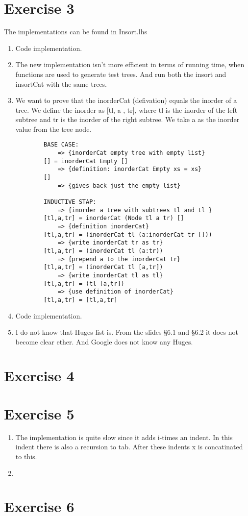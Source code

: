 \documentclass{article}
\begin{document}
\section*{Exercise 3}
The implementations can be found in Insort.lhs\\
\begin{enumerate}
    \item Code implementation.
    \item The new implementation isn't more efficient in terms of running time, when functions are used to generate test trees. And run both the insort and insortCat with the same trees.
    \item We want to prove that the inorderCat (defivation) equals the inorder of a tree. We define the inorder as [tl, a , tr], where tl is the inorder of the left subtree and tr is the inorder of the right subtree. We take a as the inorder value from the tree node.
        \begin{verbatim}
        BASE CASE:
            => {inorderCat empty tree with empty list}
        [] = inorderCat Empty []
            => {definition: inorderCat Empty xs = xs}
        []
            => {gives back just the empty list}
        
        INDUCTIVE STAP:
            => {inorder a tree with subtrees tl and tl }
        [tl,a,tr] = inorderCat (Node tl a tr) []
            => {definition inorderCat}
        [tl,a,tr] = (inorderCat tl (a:inorderCat tr []))
            => {write inorderCat tr as tr}
        [tl,a,tr] = (inorderCat tl (a:tr))
            => {prepend a to the inorderCat tr}
        [tl,a,tr] = (inorderCat tl [a,tr])
            => {write inorderCat tl as tl}
        [tl,a,tr] = (tl [a,tr])
            => {use definition of inorderCat}
        [tl,a,tr] = [tl,a,tr]
        \end{verbatim}
    
    \item Code implementation. 
    \item I do not know that Huges list is. From the slides §6.1 and §6.2 it does not become clear ether. And Google does not know any Huges.
\end{enumerate}


\section*{Exercise 4}
%
%
%
%

\section*{Exercise 5}
\begin{enumerate}
  \item The implementation is quite slow since it adds i-times an indent. In this indent there is also a recursion to tab.  After these indents x is concatinated to this.
  \item
\end{enumerate}

\section*{Exercise 6}
\end{document}
